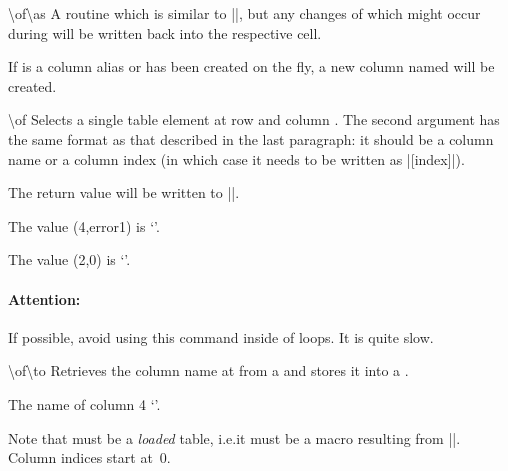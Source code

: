 \documentclass[a4paper]{ltxdoc}
\begin{document}
\begin{command}{\pgfplotstablemodifyeachcolumnelement{}\textbackslash of\textbackslash as}
    A routine which is similar to |\pgfplotstableforeachcolumnelement|, but any
    changes of  which might occur during
     will be written back into the respective cell.
\begin{codeexample}[]
\loadedtable
{}\of\loadedtable\as\cell{%
    \edef\cell{\#\pgfplotstablerow: \cell}%
}
\pgfplotstabletypeset[columns=error1,string type]{\loadedtable}
\end{codeexample}

    If  is a column alias or has been created on the fly, a
    new column named  will be created.
\end{command}

\begin{command}{\pgfplotstablegetelem{}\textbackslash of}
    Selects a single table element at row  and column . The
    second argument has the same format as that described in the last
    paragraph: it should be a column name or a column index (in which case it
    needs to be written as |[index]|).

    The return value will be written to |\pgfplotsretval|.
\begin{codeexample}[]
\of{\loadedtable}
The value (4,error1) is `\pgfplotsretval'.

\of{\loadedtable}
The value (2,0) is `\pgfplotsretval'.
\end{codeexample}

    \paragraph{Attention:}

    If possible, avoid using this command inside of loops. It is quite slow.
\end{command}

\begin{command}{\pgfplotstablegetcolumnnamebyindex{}\textbackslash of\textbackslash to}
    Retrieves the column name at  from a  and
    stores it into a .
\begin{codeexample}[]
\of{\loadedtable}\to\pgfplotsretval
The name of column 4 `\pgfplotsretval'.
\end{codeexample}
    \noindent Note that  must be a \emph{loaded} table, i.e.\@ it
    must be a macro resulting from |\pgfplotstableread|. Column indices start
    at~$0$.
\end{command}
\end{document}
